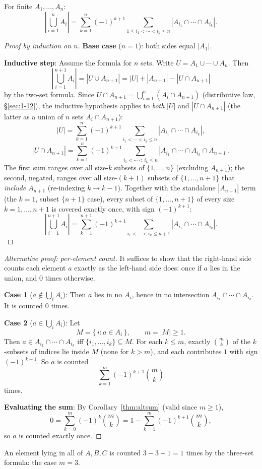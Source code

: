 \bigskip
\begin{theorem}
For finite $A_1,\dots,A_n$:
\[
\left|\bigcup_{i=1}^n A_i\right| = \sum_{k=1}^n (-1)^{k+1} \sum_{1\le i_1<\cdots<i_k\le n} |A_{i_1}\cap\cdots\cap A_{i_k}|.
\]
\end{theorem}
\begin{proof}[Proof by induction on $n$]
\textbf{Base case} ($n=1$): both sides equal $|A_1|$.

\textbf{Inductive step}: Assume the formula for $n$ sets. Write $U=A_1\cup\cdots\cup A_n$. Then
\[
\left|\bigcup_{i=1}^{n+1}A_i\right| = |U \cup A_{n+1}| = |U| + |A_{n+1}| - |U\cap A_{n+1}|
\]
by the two-set formula. Since $U\cap A_{n+1} = \bigcup_{i=1}^n (A_i\cap A_{n+1})$ (distributive law, \S\ref{sec:1-12}), the inductive hypothesis applies to \emph{both} $|U|$ and $|U\cap A_{n+1}|$ (the latter as a union of $n$ sets $A_i\cap A_{n+1}$):
\[
|U| = \sum_{k=1}^n(-1)^{k+1}\!\!\sum_{i_1<\cdots<i_k\le n}\!\! |A_{i_1}\cap\cdots\cap A_{i_k}|,
\]
\[
|U\cap A_{n+1}| = \sum_{k=1}^n(-1)^{k+1}\!\!\sum_{i_1<\cdots<i_k\le n}\!\! |A_{i_1}\cap\cdots\cap A_{i_k}\cap A_{n+1}|.
\]
The first sum ranges over all size-$k$ subsets of $\{1,\dots,n\}$ (excluding $A_{n+1}$); the second, negated, ranges over all size-$(k{+}1)$ subsets of $\{1,\dots,n+1\}$ that \emph{include} $A_{n+1}$ (re-indexing $k\to k-1$). Together with the standalone $|A_{n+1}|$ term (the $k=1$, subset $\{n{+}1\}$ case), every subset of $\{1,\dots,n+1\}$ of every size $k=1,\dots,n+1$ is covered exactly once, with sign $(-1)^{k+1}$:
\[
\left|\bigcup_{i=1}^{n+1}A_i\right| = \sum_{k=1}^{n+1}(-1)^{k+1}\!\!\sum_{i_1<\cdots<i_k\le n+1}\!\! |A_{i_1}\cap\cdots\cap A_{i_k}|.
\]
\end{proof}

\begin{proof}[Alternative proof: per-element count]
It suffices to show that the right-hand side counts each element $a$ exactly as the left-hand side does: once if $a$ lies in the union, and $0$ times otherwise.

\textbf{Case 1} ($a\notin\bigcup_i A_i$): Then $a$ lies in no $A_i$, hence in no intersection $A_{i_1}\cap\cdots\cap A_{i_k}$. It is counted $0$ times.

\textbf{Case 2} ($a\in\bigcup_i A_i$): Let
\[
M=\{\,i : a\in A_i\,\},\qquad m=|M|\ge1.
\]
Then $a\in A_{i_1}\cap\cdots\cap A_{i_k}$ iff $\{i_1,\dots,i_k\}\subseteq M$. For each $k\le m$, exactly $\binom{m}{k}$ of the $k$-subsets of indices lie inside $M$ (none for $k>m$), and each contributes $1$ with sign $(-1)^{k+1}$. So $a$ is counted
\[
\sum_{k=1}^{m}(-1)^{k+1}\binom{m}{k}
\]
times.

\textbf{Evaluating the sum}: By Corollary~\ref{thm:altsum} (valid since $m\ge1$),
\[
0=\sum_{k=0}^{m}(-1)^k\binom{m}{k} = 1-\sum_{k=1}^{m}(-1)^{k+1}\binom{m}{k},
\]
so $a$ is counted exactly once.
\end{proof}
\begin{example}
An element lying in all of $A,B,C$ is counted $3-3+1=1$ times by the three-set formula: the case $m=3$.
\end{example}

